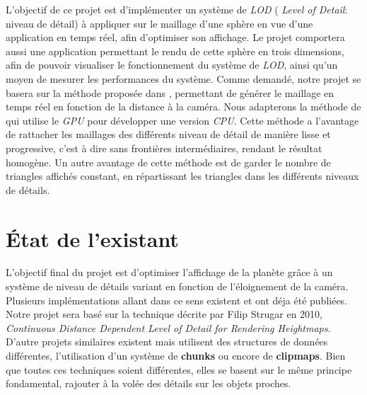 \documentclass[12pt]{report}
\begin{document}
L'objectif de ce projet est d'implémenter un système de \emph{LOD} (
\emph{Level of Detail}: niveau de détail) à appliquer sur le maillage
d'une sphère en vue d'une application en temps réel, afin d'optimiser
son affichage. Le projet comportera aussi une application permettant le
rendu de cette sphère en trois dimensions, afin de pouvoir visualiser le
fonctionnement du système de \emph{LOD}, ainsi qu'un moyen de mesurer
les performances du système. Comme demandé, notre projet se basera sur
la méthode proposée dans \cite{CDLOD}, permettant de générer le
maillage en temps réel en fonction de la distance à la caméra. Nous
adapterons la méthode de \cite{CDLOD} qui utilise le \emph{GPU}
pour développer une version \emph{CPU}. Cette méthode a l'avantage de
rattacher les maillages des différents niveau de détail de manière lisse
et progressive, c'est à dire sans frontières intermédiaires, rendant le
résultat homogène. Un autre avantage de cette méthode est de garder le
nombre de triangles affichés constant, en répartissant les triangles
dans les différents niveaux de détails.

\newpage

\chapter*{État de l'existant}
\setcounter{chapter}{2}

L'objectif final du projet est d'optimiser l'affichage de la planète grâce à un système de niveau de détails variant en fonction de l'éloignement de la caméra. Plusieurs implémentations allant dans ce sens existent et ont déja été publiées.
Notre projet sera basé sur la technique décrite par Filip Strugar en 2010, \textit{Continuous Distance Dependent Level of Detail for Rendering Heightmaps}.
D'autre projets similaires existent mais utilisent des structures de données différentes, l'utilisation d'un système de \textbf{chunks} ou encore de \textbf{clipmaps}. Bien que toutes ces techniques soient différentes, elles se basent sur le même principe fondamental, rajouter à la volée des détails sur les objets proches.



\newpage
\end{document}
